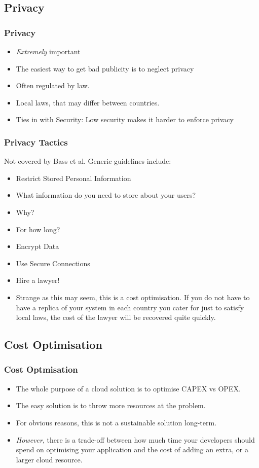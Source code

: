 \documentclass[10pt]{beamer}
\def\subitem{\item[\hspace{1.5cm} -]}
\begin{document}
\subsection{Privacy}
\begin{frame}[t]
\frametitle{Privacy}
\begin{itemize}
\item \emph{Extremely} important
\item The easiest way to get bad publicity is to neglect privacy
\item Often regulated by law.
\item Local laws, that may differ between countries.
\item Ties in with Security: Low security makes it harder to enforce privacy
\end{itemize}
\end{frame}

\begin{frame}[t]
\frametitle{Privacy Tactics}
Not covered by Bass et al. Generic guidelines include:
\begin{itemize}
\item Restrict Stored Personal Information
\subitem What information do you need to store about your users?
\subitem Why?
\subitem For how long?
\item Encrypt Data
\item Use Secure Connections
\item Hire a lawyer!
\subitem Strange as this may seem, this is a cost optimisation. If you do not have to have a replica of your system in each country you cater for just to satisfy local laws, the cost of the lawyer will be recovered quite quickly.
\end{itemize}
\end{frame}

\subsection{Cost Optimisation}
\begin{frame}[t]
\frametitle{Cost Optmisation}
\begin{itemize}
\item The whole purpose of a cloud solution is to optimise CAPEX vs OPEX.
\item The easy solution is to throw more resources at the problem.
\item For obvious reasons, this is not a sustainable solution long-term.
\item \emph{However}, there is a trade-off between how much time your developers should spend on optimising your application and the cost of adding an extra, or a larger cloud resource.
\end{itemize}
\end{frame}
\end{document}
